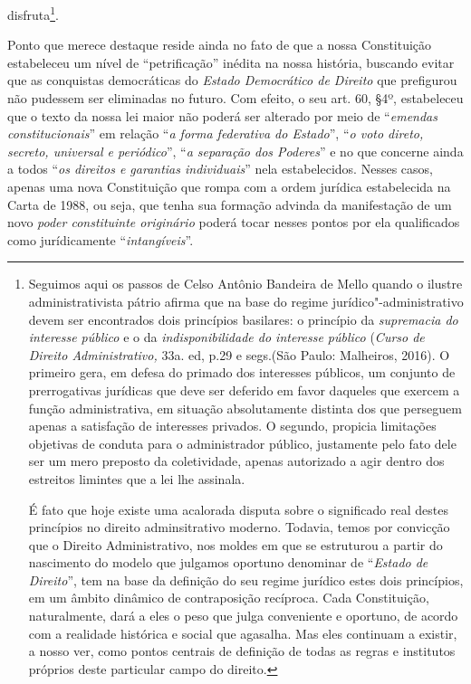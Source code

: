 disfruta\footnote{Seguimos aqui os passos de Celso Antônio Bandeira de
  Mello quando o ilustre administrativista pátrio afirma que na base do
  regime jurídico"-administrativo devem ser encontrados dois princípios
  basilares: o princípio da \emph{supremacia do interesse público} e o
  da \emph{indisponibilidade do interesse público} (\emph{Curso de
  Direito Administrativo,} 33a. ed, p.29 e segs.(São Paulo: Malheiros,
  2016). O primeiro gera, em defesa do primado dos interesses públicos,
  um conjunto de prerrogativas jurídicas que deve ser deferido em favor
  daqueles que exercem a função administrativa, em situação
  absolutamente distinta dos que perseguem apenas a satisfação de
  interesses privados. O segundo, propicia limitações objetivas de
  conduta para o administrador público, justamente pelo fato dele ser um
  mero preposto da coletividade, apenas autorizado a agir dentro dos
  estreitos limintes que a lei lhe assinala.

  É fato que hoje existe uma acalorada disputa sobre o significado real
  destes princípios no direito adminsitrativo moderno. Todavia, temos
  por convicção que o Direito Administrativo, nos moldes em que se
  estruturou a partir do nascimento do modelo que julgamos oportuno
  denominar de ``\emph{Estado de Direito}'', tem na base da definição do
  seu regime jurídico estes dois princípios, em um âmbito dinâmico de
  contraposição recíproca. Cada Constituição, naturalmente, dará a eles
  o peso que julga conveniente e oportuno, de acordo com a realidade
  histórica e social que agasalha. Mas eles continuam a existir, a nosso
  ver, como pontos centrais de definição de todas as regras e institutos
  próprios deste particular campo do direito.}.

Ponto que merece destaque reside ainda no fato de que a nossa
Constituição estabeleceu um nível de ``petrificação'' inédita na nossa
história, buscando evitar que as conquistas democráticas do \emph{Estado
Democrático de Direito} que prefigurou não pudessem ser eliminadas no
futuro. Com efeito, o seu art. 60, §4º, estabeleceu que o texto da nossa
lei maior não poderá ser alterado por meio de ``\emph{emendas
constitucionais}'' em relação ``\emph{a forma federativa do Estado}'',
``\emph{o voto direto, secreto, universal e periódico}'', ``\emph{a
separação dos Poderes}'' e no que concerne ainda a todos ``\emph{os
direitos e garantias individuais}'' nela estabelecidos. Nesses casos,
apenas uma nova Constituição que rompa com a ordem jurídica estabelecida
na Carta de 1988, ou seja, que tenha sua formação advinda da
manifestação de um novo \emph{poder constituinte originário} poderá
tocar nesses pontos por ela qualificados como jurídicamente
``\emph{intangíveis}''.

